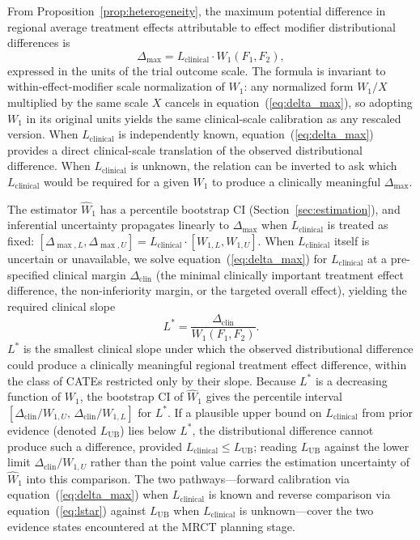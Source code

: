 \documentclass[AMA,Times1COL]{WileyNJDv5}
\begin{document}
From Proposition~\ref{prop:heterogeneity}, the maximum potential difference in regional average treatment effects attributable to effect modifier distributional differences is
\begin{equation}
\Delta_{\max} = L_{\text{clinical}} \cdot W_1(F_1, F_2),
\label{eq:delta_max}
\end{equation}
expressed in the units of the trial outcome scale. The formula is invariant to within-effect-modifier scale normalization of $W_1$: any normalized form $W_1 / X$ multiplied by the same scale $X$ cancels in equation~(\ref{eq:delta_max}), so adopting $W_1$ in its original units yields the same clinical-scale calibration as any rescaled version. When $L_{\text{clinical}}$ is independently known, equation~(\ref{eq:delta_max}) provides a direct clinical-scale translation of the observed distributional difference. When $L_{\text{clinical}}$ is unknown, the relation can be inverted to ask which $L_{\text{clinical}}$ would be required for a given $W_1$ to produce a clinically meaningful $\Delta_{\max}$.

The estimator $\widehat{W}_1$ has a percentile bootstrap CI (Section~\ref{sec:estimation}), and inferential uncertainty propagates linearly to $\Delta_{\max}$ when $L_{\text{clinical}}$ is treated as fixed: $[\Delta_{\max,L}, \Delta_{\max,U}] = L_{\text{clinical}} \cdot [W_{1,L}, W_{1,U}]$. When $L_{\text{clinical}}$ itself is uncertain or unavailable, we solve equation~(\ref{eq:delta_max}) for $L_{\text{clinical}}$ at a pre-specified clinical margin $\Delta_{\text{clin}}$ (the minimal clinically important treatment effect difference, the non-inferiority margin, or the targeted overall effect), yielding the required clinical slope
\begin{equation}
L^* = \frac{\Delta_{\text{clin}}}{W_1(F_1, F_2)}.
\label{eq:lstar}
\end{equation}
$L^*$ is the smallest clinical slope under which the observed distributional difference could produce a clinically meaningful regional treatment effect difference, within the class of CATEs restricted only by their slope. Because $L^*$ is a decreasing function of $W_1$, the bootstrap CI of $\widehat{W}_1$ gives the percentile interval $[\Delta_{\text{clin}}/W_{1,U},\, \Delta_{\text{clin}}/W_{1,L}]$ for $L^*$. If a plausible upper bound on $L_{\text{clinical}}$ from prior evidence (denoted $L_{\text{UB}}$) lies below $L^*$, the distributional difference cannot produce such a difference, provided $L_{\text{clinical}} \leq L_{\text{UB}}$; reading $L_{\text{UB}}$ against the lower limit $\Delta_{\text{clin}}/W_{1,U}$ rather than the point value carries the estimation uncertainty of $\widehat{W}_1$ into this comparison. The two pathways---forward calibration via equation~(\ref{eq:delta_max}) when $L_{\text{clinical}}$ is known and reverse comparison via equation~(\ref{eq:lstar}) against $L_{\text{UB}}$ when $L_{\text{clinical}}$ is unknown---cover the two evidence states encountered at the MRCT planning stage.
\end{document}
